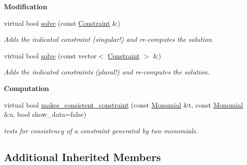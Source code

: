 \begin{Indent}\textbf{ Modification}\par
\begin{DoxyCompactItemize}
\item 
virtual bool \hyperlink{group___c_l_s_solvers_a544cb09dfa211fae9adaacfd402af9a2}{solve} (const \hyperlink{group___c_l_s_solvers_class_l_p___solvers_1_1_constraint}{Constraint} \&)
\begin{DoxyCompactList}\small\item\em Adds the indicated constraint (singular!) and re-\/computes the solution. \end{DoxyCompactList}\item 
virtual bool \hyperlink{group___c_l_s_solvers_a1ceccb6fc4eff73cc4237c46ab9e7699}{solve} (const vector$<$ \hyperlink{group___c_l_s_solvers_class_l_p___solvers_1_1_constraint}{Constraint} $>$ \&)
\begin{DoxyCompactList}\small\item\em Adds the indicated constraints (plural!) and re-\/computes the solution. \end{DoxyCompactList}\end{DoxyCompactItemize}
\end{Indent}
\begin{Indent}\textbf{ Computation}\par
\begin{DoxyCompactItemize}
\item 
\mbox{\label{group___c_l_s_solvers_a1c395efc09c537d49911656155487213}} 
virtual bool \hyperlink{group___c_l_s_solvers_a1c395efc09c537d49911656155487213}{makes\+\_\+consistent\+\_\+constraint} (const \hyperlink{group__polygroup_class_monomial}{Monomial} \&t, const \hyperlink{group__polygroup_class_monomial}{Monomial} \&u, bool show\+\_\+data=false)
\begin{DoxyCompactList}\small\item\em tests for consistency of a constraint generated by two monomials. \end{DoxyCompactList}\end{DoxyCompactItemize}
\end{Indent}
\subsection*{Additional Inherited Members}


